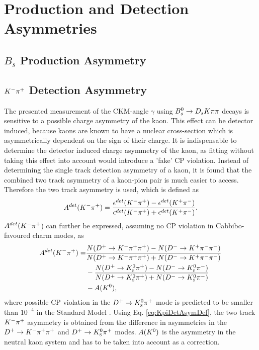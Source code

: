 \section{Production and Detection Asymmetries}

\subsection{$B_s$ Production Asymmetry}
\label{sec:productionAsym}





\subsection{${{K}^-}{{\pi}^+}$ Detection Asymmetry}
\label{sec:KpiAsym}

The presented measurement of the CKM-angle $\gamma$ using ${{B}^0_{s}}\rightarrow{\ensuremath{{D}_{s}}}{\ensuremath{K}}{\ensuremath{\pi}}{\ensuremath{\pi}}$ decays is sensitive to a possible charge asymmetry of the kaon. 
This effect can be detector induced, because kaons are known to have a nuclear cross-section which is asymmetrically dependent on the sign of their charge. 
It is indispensable to determine the detector induced charge asymmetry of the kaon, as fitting without taking this effect into account would introduce a 'fake' CP violation. 
Instead of determining the single track detection asymmetry of a kaon, it is found \cite{Gordon:1482647} that the combined two track asymmetry of a kaon-pion pair is much easier to access. 
Therefore the two track asymmetry is used, which is defined as 
\begin{equation}
A^{det}({{K}^-}{{\pi}^+}) = \frac{\epsilon^{det}({{K}^-}{{\pi}^+}) -\epsilon^{det}({{K}^+}{{\pi}^-})}{\epsilon^{det}({{K}^-}{{\pi}^+}) + \epsilon^{det}({{K}^+}{{\pi}^-})}.
\label{eq:KpiDetAsymDef}
\end{equation}
$A^{det}({{K}^-}{{\pi}^+}$) can further be expressed, assuming no CP violation in Cabbibo-favoured charm modes, as \cite{Davis:2310213}
\begin{equation}
\begin{split}
A^{det}({{K}^-}{{\pi}^+}) = & \frac{N({{D}^+}\rightarrow{\ensuremath{{K}^-}}{\ensuremath{{\pi}^+}}{\ensuremath{{\pi}^+}}) - N({{D}^-}\rightarrow{\ensuremath{{K}^+}}{\ensuremath{{\pi}^-}}{\ensuremath{{\pi}^-}})}{N({{D}^+}\rightarrow{\ensuremath{{K}^-}}{\ensuremath{{\pi}^+}}{\ensuremath{{\pi}^+}}) + N({{D}^-}\rightarrow{\ensuremath{{K}^+}}{\ensuremath{{\pi}^-}}{\ensuremath{{\pi}^-}})} \\
                  & - \frac{N({{D}^+}\rightarrow{\ensuremath{{K}^0_{\mathrm{ \scriptscriptstyle S}}}}{\ensuremath{{\pi}^+}}) - N({{D}^-}\rightarrow{\ensuremath{{K}^0_{\mathrm{ \scriptscriptstyle S}}}}{\ensuremath{{\pi}^-}})}{N({{D}^+}\rightarrow{\ensuremath{{K}^0_{\mathrm{ \scriptscriptstyle S}}}}{\ensuremath{{\pi}^+}}) + N({{D}^-}\rightarrow{\ensuremath{{K}^0_{\mathrm{ \scriptscriptstyle S}}}}{\ensuremath{{\pi}^-}})} \\
                  & - A({{K}^0}),
\end{split}
\label{eq:KpiDetAsymDef}
\end{equation}
where possible CP violation in the ${{D}^+}\rightarrow{\ensuremath{{K}^0_{\mathrm{ \scriptscriptstyle S}}}}{\ensuremath{{\pi}^+}}$ mode is predicted to be smaller than $10^{-4}$ in the Standard Model \cite{Bigi:1994aw}.
Using Eq. \ref{eq:KpiDetAsymDef}, the two track ${{K}^-}{{\pi}^+}$ asymmetry is obtained from the difference in asymmetries in the ${{D}^+}\rightarrow{\ensuremath{{K}^-}}{\ensuremath{{\pi}^+}}{\ensuremath{{\pi}^+}}$ and ${{D}^+}\rightarrow{\ensuremath{{K}^0_{\mathrm{ \scriptscriptstyle S}}}}{\ensuremath{{\pi}^+}}$ modes. 
$A({{K}^0})$ is the asymmetry in the neutral kaon system and has to be taken into account as a correction. \newline

